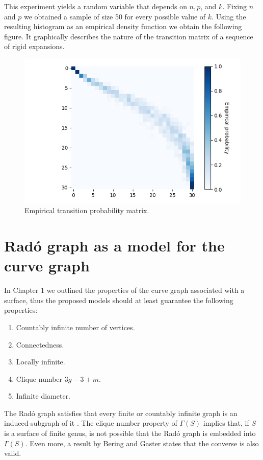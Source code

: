 This experiment yields a random variable that depends on $n, p$, and $k$. Fixing $n$ and $p$ we obtained a sample of size 50 for every possible value of $k$. Using the resulting histogram as an empirical density function we obtain the following figure. It graphically describes the nature of the transition matrix of a sequence of rigid expansions.

\begin{figure}[h!]
	\centering
	\includegraphics[scale=0.7]{Python/Figures/Transition-matrix-secuence-of-rigid-expansions.png}
	\caption{Empirical transition probability matrix.}
\end{figure}

\section{Radó graph as a model for the curve graph}

In Chapter 1 we outlined the properties of the curve graph associated with a surface, thus the proposed models should at least guarantee the following properties:

\begin{enumerate}
\item Countably infinite number of vertices.
\item Connectedness.
\item Locally infinite.
\item Clique number $3g-3+m$.
\item Infinite diameter.
\end{enumerate}

The Radó graph satisfies that every finite or countably infinite graph is an induced subgraph of it \cite[Cameron 97]{theRandomGraph}. The clique number property of $\Gamma(S)$ implies that, if $S$ is a surface of finite genus, is not possible that the Radó graph is embedded into $\Gamma(S)$. Even more, a result by Bering and Gaster \cite[Bering, Gaster 17]{beringGaster} states that the converse is also valid.

